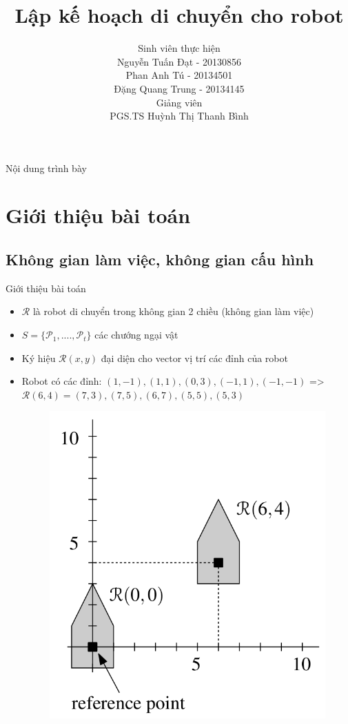 \documentclass[compress]{beamer}
\title[Lập kế hoạch di chuyển cho robot]{Lập kế hoạch di chuyển cho robot}
\author[Nguyễn Tuấn Đạt, Đặng Quang Trung, Phan Anh Tú (SoICT)]{
Sinh viên thực hiện\\
Nguyễn Tuấn Đạt - 20130856 \\
Phan Anh Tú - 20134501 \\
Đặng Quang Trung - 20134145 \\[1em]
Giảng viên \\
PGS.TS Huỳnh Thị Thanh Bình}
\begin{document}
\begin{frame}[plain]
\titlepage
\end{frame}

\begin{frame}[plain]{Nội dung trình bày}
\tableofcontents
\end{frame}

\section{Giới thiệu bài toán}

\subsection{Không gian làm việc, không gian cấu hình}
\begin{frame}{Giới thiệu bài toán}
\begin{itemize}
\item $\mathcal{R}$ là robot di chuyển trong không gian 2 chiều (không gian làm việc) 
\item $S = \{\mathcal{P}_1, ...., \mathcal{P}_t\}$ các chướng ngại vật 
\item Ký hiệu $\mathcal{R}(x,y)$ đại diện cho vector vị trí các đỉnh của robot
\item Robot có các đỉnh: $(1,-1), (1,1), (0,3), (-1,1), (-1,-1)$ => $\mathcal{R}(6,4) = (7,3), (7,5), (6,7), (5,5), (5,3)$
\begin{figure}[H]
\centering
\includegraphics[scale=0.2]{work_space_definition.png}
\end{figure}
\end{itemize}
\end{frame}
\end{document}
